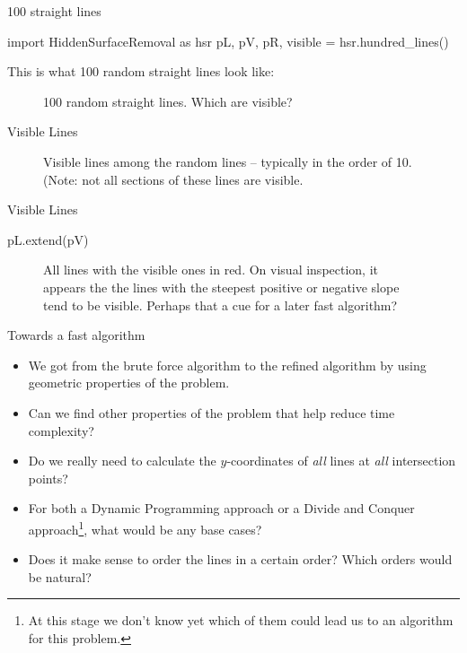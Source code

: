 \documentclass{article}
\begin{document}
\begin{frame}[fragile]{100 straight lines}

  \begin{sympysilent}
    import HiddenSurfaceRemoval as hsr
    pL, pV, pR, visible = hsr.hundred_lines()
  \end{sympysilent}



  This is what 100 random straight lines look like:
  \begin{figure}
    \caption{100 random straight lines. Which are visible?}
    \centering
  \end{figure}
\end{frame}

\begin{frame}{Visible Lines}

  \begin{figure}
    \caption{Visible lines among the random lines -- typically in the
      order of 10. (Note: not all sections of these lines are visible.}
    \centering
  \end{figure}

\end{frame}

\begin{frame}[fragile]{Visible Lines}

  \begin{sympysilent}
    pL.extend(pV)
  \end{sympysilent}

  \begin{figure}
    \caption{All lines with the visible ones in red.   On visual inspection, it appears the the lines with the steepest
  positive or negative slope tend to be visible. Perhaps that a cue
  for a later fast algorithm?}
    \centering
  \end{figure}
\end{frame}

\begin{frame}{Towards a fast algorithm}

\begin{itemize}[<+->]
    \item We got from the brute force algorithm to the refined
      algorithm by using geometric properties of the problem. 
    \item Can we find other properties of the problem that help reduce
      time complexity? 
    \item Do we really need to calculate the $y$-coordinates of
      \emph{all} lines at \emph{all} intersection points? 
    \item For both a Dynamic Programming approach or a Divide and
      Conquer approach\footnote{At this stage we don't know yet which
        of them could lead us to an algorithm for this problem.}, 
      what would be any base cases?
    \item Does it make sense to order the lines in a certain order?
      Which orders would be natural? 
\end{itemize}
\end{frame}
\end{document}
